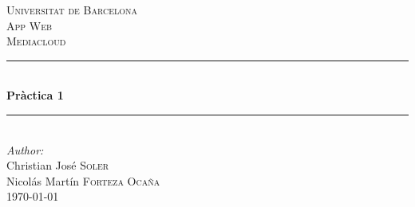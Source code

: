 \begin{titlepage}

\newcommand{\HRule}{\rule{\linewidth}{0.5mm}} %

\center %
 

\textsc{\LARGE Universitat de Barcelona}\\[1.5cm] %
\textsc{\Large App Web}\\[0.5cm] %
\textsc{\large Mediacloud}\\[0.5cm] %


\HRule \\[0.4cm]
{ \huge \bfseries Pràctica 1}\\[0.4cm] %
\HRule \\[1.5cm]
 



\Large \emph{Author:}\\
Christian José \textsc{Soler}\\
Nicolás Martín \textsc{Forteza Ocaña}\\[3cm] %


{\large \today}\\[3cm] %


 

\vfill %

\end{titlepage}
\tableofcontents
\newpage
